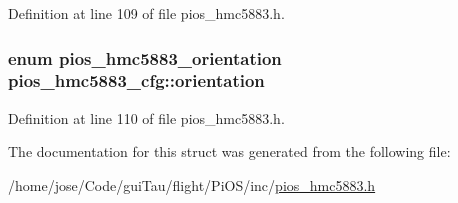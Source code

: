 Definition at line 109 of file pios\-\_\-hmc5883.\-h.

\hypertarget{structpios__hmc5883__cfg_ab8151b7d77ee14eb956089aa262c8de7}{
\subsubsection[{orientation}]{\setlength{\rightskip}{0pt plus 5cm}enum {\bf pios\-\_\-hmc5883\-\_\-orientation} pios\-\_\-hmc5883\-\_\-cfg\-::orientation}}\label{structpios__hmc5883__cfg_ab8151b7d77ee14eb956089aa262c8de7}


Definition at line 110 of file pios\-\_\-hmc5883.\-h.



The documentation for this struct was generated from the following file\-:\begin{DoxyCompactItemize}
\item 
/home/jose/\-Code/gui\-Tau/flight/\-Pi\-O\-S/inc/\hyperlink{pios__hmc5883_8h}{pios\-\_\-hmc5883.\-h}\end{DoxyCompactItemize}
